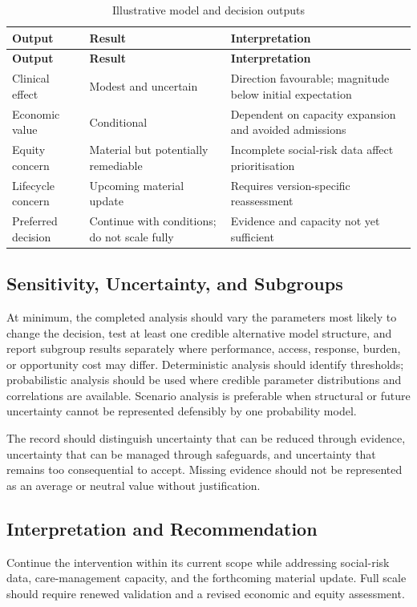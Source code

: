 \begin{longtable}{@{}p{}p{}p{}@{}}
\caption{Illustrative model and decision outputs}
\label{tab:comp-ch12-outputs}\\
\toprule
\textbf{Output} & \textbf{Result} & \textbf{Interpretation} \\
\midrule
\endfirsthead
\toprule
\textbf{Output} & \textbf{Result} & \textbf{Interpretation} \\
\midrule
\endhead
\bottomrule
\endlastfoot
Clinical effect & Modest and uncertain & Direction favourable; magnitude below initial expectation \\
Economic value & Conditional & Dependent on capacity expansion and avoided admissions \\
Equity concern & Material but potentially remediable & Incomplete social-risk data affect prioritisation \\
Lifecycle concern & Upcoming material update & Requires version-specific reassessment \\
Preferred decision & Continue with conditions; do not scale fully & Evidence and capacity not yet sufficient \\
\end{longtable}

\subsection{Sensitivity, Uncertainty, and Subgroups}
At minimum, the completed analysis should vary the parameters most likely to
change the decision, test at least one credible alternative model structure, and
report subgroup results separately where performance, access, response, burden,
or opportunity cost may differ. Deterministic analysis should identify thresholds;
probabilistic analysis should be used where credible parameter distributions and
correlations are available. Scenario analysis is preferable when structural or
future uncertainty cannot be represented defensibly by one probability model.

The record should distinguish uncertainty that can be reduced through evidence,
uncertainty that can be managed through safeguards, and uncertainty that remains
too consequential to accept. Missing evidence should not be represented as an
average or neutral value without justification.

\subsection{Interpretation and Recommendation}
Continue the intervention within its current scope while addressing social-risk data, care-management capacity, and the forthcoming material update. Full scale should require renewed validation and a revised economic and equity assessment.

